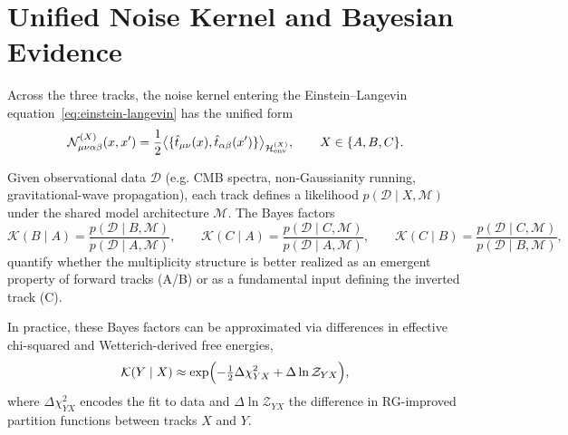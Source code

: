 \documentclass[11pt]{article}
\begin{document}
\section{Unified Noise Kernel and Bayesian Evidence}

Across the three tracks, the noise kernel entering the Einstein--Langevin equation~\eqref{eq:einstein-langevin} has the unified form
\begin{equation}
  \mathcal{N}^{(X)}_{\mu\nu\alpha\beta}(x,x')
  =
  \frac{1}{2}
  \big\langle
    \{\hat{t}_{\mu\nu}(x), \hat{t}_{\alpha\beta}(x')\}
  \big\rangle_{\mathcal{H}_{\rm env}^{(X)}},
  \qquad X \in \{A,B,C\}.
\end{equation}

Given observational data $\mathcal{D}$ (e.g. CMB spectra, non-Gaussianity running, gravitational-wave propagation), each track defines a likelihood $p(\mathcal{D}\mid X,\mathcal{M})$ under the shared model architecture $\mathcal{M}$. The Bayes factors
\begin{equation}
  \mathcal{K}(B\mid A) = \frac{p(\mathcal{D}\mid B,\mathcal{M})}{p(\mathcal{D}\mid A,\mathcal{M})},
  \qquad
  \mathcal{K}(C\mid A) = \frac{p(\mathcal{D}\mid C,\mathcal{M})}{p(\mathcal{D}\mid A,\mathcal{M})},
  \qquad
  \mathcal{K}(C\mid B) = \frac{p(\mathcal{D}\mid C,\mathcal{M})}{p(\mathcal{D}\mid B,\mathcal{M})},
\end{equation}
quantify whether the multiplicity structure is better realized as an emergent property of forward tracks (A/B) or as a fundamental input defining the inverted track (C).

In practice, these Bayes factors can be approximated via differences in effective chi-squared and Wetterich-derived free energies,
\begin{equation}
  \mathcal{K}(Y\mid X)
  \approx
  \exp\Bigl(-\tfrac{1}{2}\Delta\chi^2_{YX} + \Delta\ln\mathcal{Z}_{YX}\Bigr),
\end{equation}
where $\Delta\chi^2_{YX}$ encodes the fit to data and $\Delta\ln\mathcal{Z}_{YX}$ the difference in RG-improved partition functions between tracks $X$ and $Y$.
\end{document}
